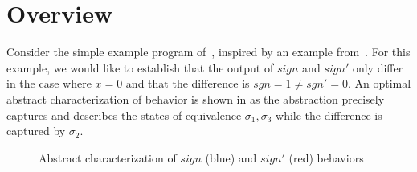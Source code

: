 \section{Overview}



Consider the simple example program of~, inspired by an example from~\cite{RM:TOPLAS07}. For this example, we would like to establish that the output of $sign$ and $sign'$ only differ in the case where $x=0$ and that the difference is $sgn = 1 \neq sgn' = 0$. An optimal abstract characterization of behavior is shown in  as the abstraction precisely captures and describes the states of equivalence $\sigma_1,\sigma_3$ while the difference is captured by $\sigma_2$.

\begin{figure}
\caption{Abstract characterization of $sign$ (blue) and $sign'$ (red) behaviors}
\end{figure}

